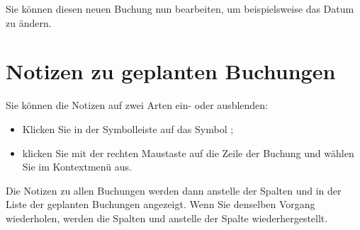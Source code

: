 Sie können diesen neuen Buchung nun bearbeiten, um beispielsweise das Datum zu ändern.


\section{Notizen zu geplanten Buchungen\label{plannedtransactions-comments}}

Sie können die Notizen auf zwei Arten ein- oder ausblenden:
\begin{itemize}
	\item Klicken Sie in der Symbolleiste auf das Symbol ;
	\item klicken Sie mit der rechten Maustaste auf die Zeile der Buchung und wählen Sie im Kontextmenü  aus.
\end{itemize}

Die Notizen zu allen Buchungen werden dann anstelle der Spalten  und  in der Liste der geplanten Buchungen angezeigt. Wenn Sie denselben Vorgang wiederholen, werden die Spalten  und  anstelle der Spalte  wiederhergestellt.

